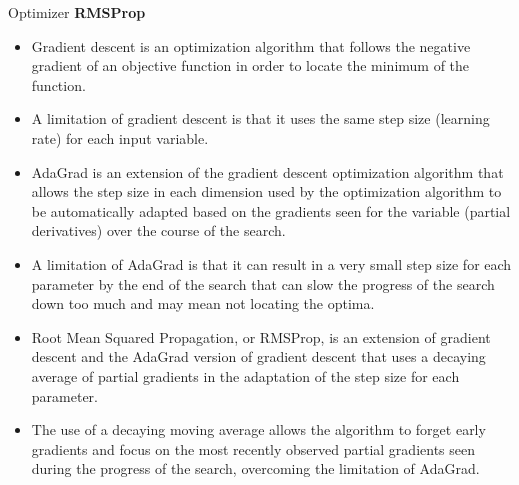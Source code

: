 \documentclass[11pt]{beamer}
\begin{document}
\begin{frame}{Optimizer}
\textbf{RMSProp} 
\scriptsize
\begin{itemize}
\item Gradient descent is an optimization algorithm that follows the negative gradient of an objective function in order to locate the minimum of the function.

\item A limitation of gradient descent is that it uses the same step size (learning rate) for each input variable. 

\item AdaGrad is an extension of the gradient descent optimization algorithm that allows the step size in each dimension used by the optimization algorithm to be automatically adapted based on the gradients seen for the variable (partial derivatives) over the course of the search.

\item A limitation of AdaGrad is that it can result in a very small step size for each parameter by the end of the search that can slow the progress of the search down too much and may mean not locating the optima.

\item Root Mean Squared Propagation, or RMSProp, is an extension of gradient descent and the AdaGrad version of gradient descent that uses a decaying average of partial gradients in the adaptation of the step size for each parameter. 

\item The use of a decaying moving average allows the algorithm to forget early gradients and focus on the most recently observed partial gradients seen during the progress of the search, overcoming the limitation of AdaGrad. 
\end{itemize}
\end{frame}
\end{document}
